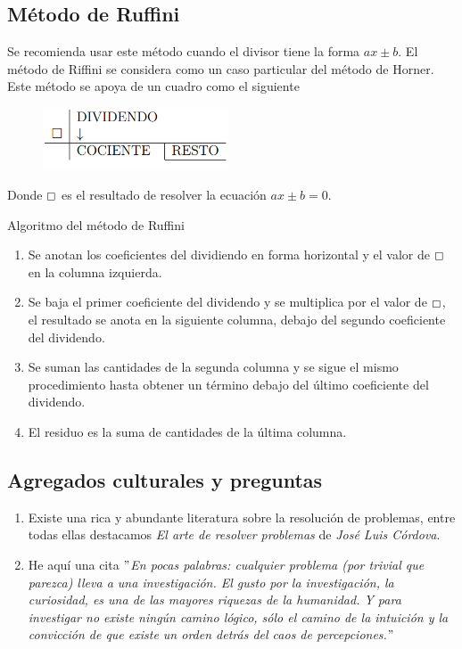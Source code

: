 {    \subsection{Método de Ruffini}
    {
        Se recomienda usar este método cuando el divisor tiene la forma $ax \pm b$. El método de Riffini se considera como un caso particular del método de Horner.
        Este método se apoya de un cuadro como el siguiente
        \begin{figure}[htb]
            \centering
            \includegraphics[width=5.5cm]{images/metodo-de-ruffini}
        \end{figure}

        Donde $\boxempty$ es el resultado de resolver la ecuación $ax \pm b = 0$.

        Algoritmo del método de Ruffini
        \begin{enumerate}
            \item Se anotan los coeficientes del dividiendo en forma horizontal y el valor de $\boxempty$ en la columna izquierda.
            \item Se baja el primer coeficiente del dividendo y se multiplica por el valor de $\boxempty$, el resultado se anota en la siguiente columna,
            debajo del segundo coeficiente del dividendo.
            \item Se suman las cantidades de la segunda columna y se sigue el mismo procedimiento hasta obtener un término debajo del último coeficiente del dividendo.
            \item El residuo es la suma de cantidades de la última columna.
        \end{enumerate}
    }

    \subsection{Agregados culturales y preguntas}
    {
        \begin{enumerate}
            \item Existe una rica y abundante literatura sobre la resolución de problemas, entre todas ellas destacamos \textit{El arte de resolver problemas} de \textit{José Luis Córdova}.
            \item He aquí una cita \textit{\("\)En pocas palabras: cualquier problema (por trivial que parezca) lleva a una investigación.
            El gusto por la investigación, la curiosidad, es una de las mayores riquezas de la humanidad.
            Y para investigar no existe ningún camino lógico, sólo el camino de la intuición y la convicción de que existe un orden detrás del caos de percepciones.\("\)}
        \end{enumerate}
    }

}
